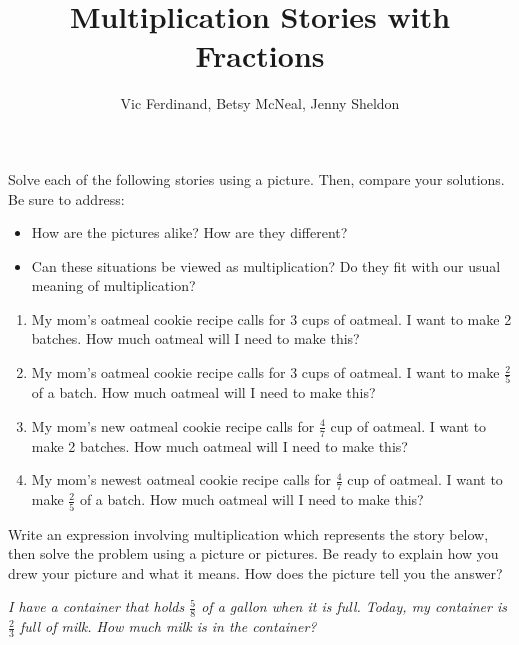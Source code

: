 \documentclass[nooutcomes]{ximera}
\title{Multiplication Stories with Fractions}
\author{Vic Ferdinand, Betsy McNeal, Jenny Sheldon}
\begin{document}
\begin{abstract} \end{abstract}
\maketitle




\begin{problem}
 Solve each of the following stories using a picture.  Then, compare your solutions.  Be sure to address:   
\begin{itemize}
    \item How are the pictures alike?  How are they different?
    \item Can these situations be viewed as multiplication?  Do they fit with our usual meaning of multiplication?
\end{itemize}

\begin{enumerate}%
    \item My mom's oatmeal cookie recipe calls for 3 cups of oatmeal.  
I want to make 2 batches.
How much oatmeal will I need to make this?
    \item My mom's oatmeal cookie recipe calls for 3 cups of oatmeal.  
I want to make $\frac{2}{5}$ of a batch.
How much oatmeal will I need to make this?
    \item My mom's new oatmeal cookie recipe calls for $\frac{4}{7}$ cup of oatmeal.  
I want to make 2 batches.
How much oatmeal will I need to make this?
    \item My mom's newest oatmeal cookie recipe calls for  $\frac{4}{7}$ cup of oatmeal.  
I want to make $\frac{2}{5}$ of a batch.
How much oatmeal will I need to make this?
\end{enumerate}

\end{problem}

\newpage




\begin{problem}
 Write an expression involving multiplication which represents the story below, then solve the problem using a picture or pictures.  Be ready to explain how you drew your picture and what it means.  How does the picture tell you the answer?

\emph{I have a container that holds $\frac{5}{8}$ of a gallon when it is full.  Today, my container is $\frac{2}{3}$ full of milk. How much milk is in the container?}
\end{problem}
\vfill
\end{document}
